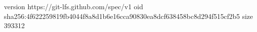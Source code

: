 version https://git-lfs.github.com/spec/v1
oid sha256:4f622259819fb4044f8a8d1b6e16cca90830ea8dcf638458bc8d294f515cf2b5
size 393312
